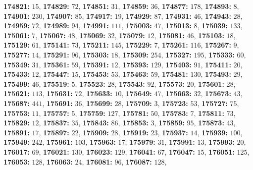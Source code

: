 \textsf{\bfseries 174821:} $15$, \textsf{\bfseries 174829:} $72$, \textsf{\bfseries 174851:} $31$, \textsf{\bfseries 174859:} $36$, \textsf{\bfseries 174877:} $178$, \textsf{\bfseries 174893:} $8$, \textsf{\bfseries 174901:} $230$, \textsf{\bfseries 174907:} $85$, \textsf{\bfseries 174917:} $19$, \textsf{\bfseries 174929:} $87$, \textsf{\bfseries 174931:} $46$, \textsf{\bfseries 174943:} $28$, \textsf{\bfseries 174959:} $72$, \textsf{\bfseries 174989:} $94$, \textsf{\bfseries 174991:} $111$, \textsf{\bfseries 175003:} $47$, \textsf{\bfseries 175013:} $8$, \textsf{\bfseries 175039:} $133$, \textsf{\bfseries 175061:} $7$, \textsf{\bfseries 175067:} $48$, \textsf{\bfseries 175069:} $32$, \textsf{\bfseries 175079:} $12$, \textsf{\bfseries 175081:} $46$, \textsf{\bfseries 175103:} $18$, \textsf{\bfseries 175129:} $61$, \textsf{\bfseries 175141:} $73$, \textsf{\bfseries 175211:} $145$, \textsf{\bfseries 175229:} $7$, \textsf{\bfseries 175261:} $116$, \textsf{\bfseries 175267:} $9$, \textsf{\bfseries 175277:} $14$, \textsf{\bfseries 175291:} $96$, \textsf{\bfseries 175303:} $18$, \textsf{\bfseries 175309:} $254$, \textsf{\bfseries 175327:} $195$, \textsf{\bfseries 175333:} $60$, \textsf{\bfseries 175349:} $31$, \textsf{\bfseries 175361:} $59$, \textsf{\bfseries 175391:} $12$, \textsf{\bfseries 175393:} $129$, \textsf{\bfseries 175403:} $91$, \textsf{\bfseries 175411:} $20$, \textsf{\bfseries 175433:} $12$, \textsf{\bfseries 175447:} $15$, \textsf{\bfseries 175453:} $53$, \textsf{\bfseries 175463:} $59$, \textsf{\bfseries 175481:} $130$, \textsf{\bfseries 175493:} $29$, \textsf{\bfseries 175499:} $46$, \textsf{\bfseries 175519:} $5$, \textsf{\bfseries 175523:} $28$, \textsf{\bfseries 175543:} $92$, \textsf{\bfseries 175573:} $20$, \textsf{\bfseries 175601:} $28$, \textsf{\bfseries 175621:} $113$, \textsf{\bfseries 175631:} $72$, \textsf{\bfseries 175633:} $10$, \textsf{\bfseries 175649:} $47$, \textsf{\bfseries 175663:} $32$, \textsf{\bfseries 175673:} $43$, \textsf{\bfseries 175687:} $441$, \textsf{\bfseries 175691:} $36$, \textsf{\bfseries 175699:} $28$, \textsf{\bfseries 175709:} $3$, \textsf{\bfseries 175723:} $53$, \textsf{\bfseries 175727:} $75$, \textsf{\bfseries 175753:} $11$, \textsf{\bfseries 175757:} $5$, \textsf{\bfseries 175759:} $127$, \textsf{\bfseries 175781:} $50$, \textsf{\bfseries 175783:} $7$, \textsf{\bfseries 175811:} $73$, \textsf{\bfseries 175829:} $12$, \textsf{\bfseries 175837:} $35$, \textsf{\bfseries 175843:} $86$, \textsf{\bfseries 175853:} $3$, \textsf{\bfseries 175859:} $95$, \textsf{\bfseries 175873:} $43$, \textsf{\bfseries 175891:} $17$, \textsf{\bfseries 175897:} $22$, \textsf{\bfseries 175909:} $28$, \textsf{\bfseries 175919:} $23$, \textsf{\bfseries 175937:} $14$, \textsf{\bfseries 175939:} $100$, \textsf{\bfseries 175949:} $242$, \textsf{\bfseries 175961:} $103$, \textsf{\bfseries 175963:} $17$, \textsf{\bfseries 175979:} $31$, \textsf{\bfseries 175991:} $13$, \textsf{\bfseries 175993:} $20$, \textsf{\bfseries 176017:} $69$, \textsf{\bfseries 176021:} $130$, \textsf{\bfseries 176023:} $129$, \textsf{\bfseries 176041:} $67$, \textsf{\bfseries 176047:} $15$, \textsf{\bfseries 176051:} $125$, \textsf{\bfseries 176053:} $128$, \textsf{\bfseries 176063:} $24$, \textsf{\bfseries 176081:} $96$, \textsf{\bfseries 176087:} $128$, 

